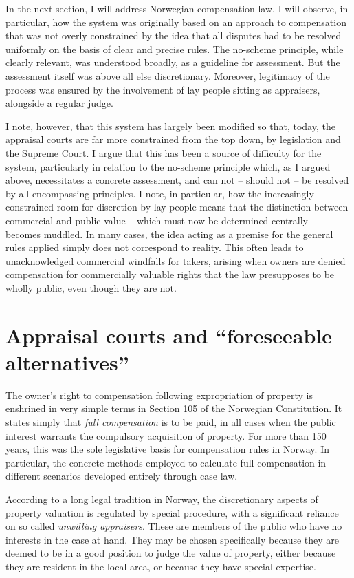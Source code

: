 In the next section, I will address Norwegian compensation law. I will observe, in particular, how the system was originally based on an approach to compensation that was not overly constrained by the idea that all disputes had to be resolved uniformly on the basis of clear and precise rules. The no-scheme principle, while clearly relevant, was understood broadly, as a guideline for assessment. But the assessment itself was above all else discretionary. Moreover, legitimacy of the process was ensured by the involvement of lay people sitting as appraisers, alongside a regular judge. 

I note, however, that this system has largely been modified so that, today, the appraisal courts are far more constrained from the top down, by legislation and the Supreme Court. I argue that this has been a source of difficulty for the system, particularly in relation to the no-scheme principle which, as I argued above, necessitates a concrete assessment, and can not -- should not -- be resolved by all-encompassing principles. I note, in particular, how the increasingly constrained room for discretion by lay people means that the distinction between commercial and public value -- which must now be determined centrally -- becomes muddled. In many cases, the idea acting as a premise for the general rules applied simply does not correspond to reality. This often leads to unacknowledged commercial windfalls for takers, arising when owners are denied compensation for commercially valuable rights that the law presupposes to be wholly public, even though they are not. 

\section{Appraisal courts and ``foreseeable alternatives''}

The owner's right to compensation following expropriation of property is enshrined in very simple terms in Section 105 of the Norwegian Constitution. It states simply that \emph{full compensation} is to be paid, in all cases when the public interest warrants the compulsory acquisition of property. For more than 150 years, this was the sole legislative basis for compensation rules in Norway. In particular, the concrete methods employed to calculate full compensation in different scenarios developed entirely through case law.

According to a long legal tradition in Norway, the discretionary aspects of property valuation is regulated by special procedure, with a significant reliance on so called \emph{unwilling appraisers}. These are members of the public who have no interests in the case at hand. They may be chosen specifically because they are deemed to be in a good position to judge the value of property, either because they are resident in the local area, or because they have special expertise.

